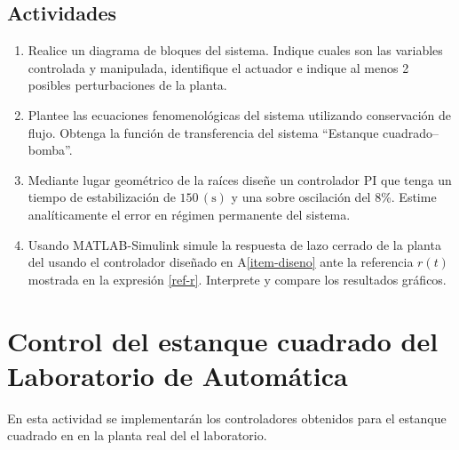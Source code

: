 \documentclass[11pt,letterpaper,notitlepage]{article}
\begin{document}
\subsection{Actividades}

\begin{enumerate}[\bfseries {A}1]

\item Realice un diagrama de bloques del sistema. Indique cuales son las variables controlada y manipulada, identifique el actuador e indique al menos 2 posibles perturbaciones de la planta.
\item  Plantee las ecuaciones fenomenológicas del sistema utilizando conservación de flujo. Obtenga la función de transferencia del sistema “Estanque cuadrado–bomba”.

\item \label{item-diseno} Mediante lugar geométrico de la raíces diseñe un controlador PI que tenga un tiempo de estabilización de $150\,(\si{\second})$ y una sobre oscilación del 8\%. Estime analíticamente el error en régimen permanente del sistema.

\item Usando MATLAB-Simulink simule la respuesta de lazo cerrado de la planta del usando el controlador diseñado en A\ref{item-diseno} ante la referencia $r(t)$ mostrada en la expresión \ref{ref-r}. Interprete y compare los resultados gráficos.

\end{enumerate}

\section{Control del estanque cuadrado del Laboratorio de Automática}

En esta actividad se implementarán los controladores obtenidos para el estanque cuadrado en en la planta real del el laboratorio.
\end{document}

